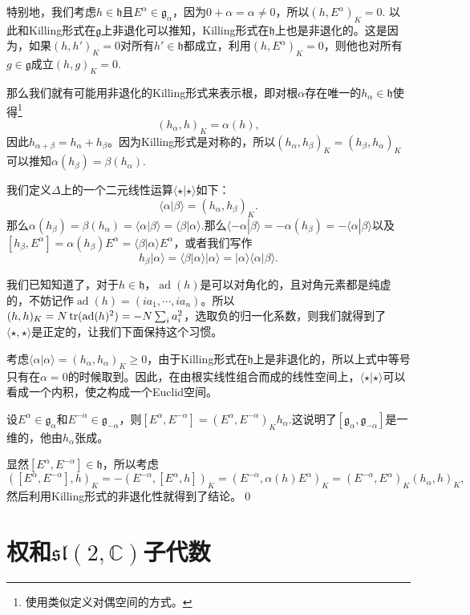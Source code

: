 \documentclass[9pt]{extarticle}
\newcommand{\cc}{\mathbb{C}}
\newcommand{\lag}{{\mathfrak{g}}}
\DeclareMathOperator{\ad}{ad}
\begin{document}
\para 特别地，我们考虑$h\in \mathfrak{h}$且$E^\alpha\in \lag_\alpha$，因为$0+\alpha=\alpha\neq 0$，所以$(h,E^\alpha)_K=0$. 以此和Killing形式在$\mathfrak{g}$上非退化可以推知，Killing形式在$\mathfrak{h}$上也是非退化的。这是因为，如果$(h,h')_K=0$对所有$h'\in \mathfrak{h}$都成立，利用$(h,E^\alpha)_K=0$，则他也对所有$g\in \lag$成立$(h,g)_K=0$.

那么我们就有可能用非退化的Killing形式来表示根，即对根$\alpha$存在唯一的$h_\alpha\in\mathfrak{h}$使得\footnote{使用类似定义对偶空间的方式。}
\[
	(h_\alpha,h)_K=\alpha(h),
\]
因此$h_{\alpha+\beta}=h_\alpha+h_\beta$。因为Killing形式是对称的，所以$(h_\alpha,h_\beta)_K=(h_\beta,h_\alpha)_K$可以推知$\alpha(h_\beta)=\beta(h_\alpha)$.

\para 我们定义$\Delta$上的一个二元线性运算$\langle \star|\star \rangle$如下：
\[
	\langle \alpha|\beta \rangle=(h_\alpha,h_\beta)_K.
\]
那么$\alpha(h_\beta)=\beta(h_\alpha)=\langle \alpha|\beta \rangle=\langle \beta|\alpha \rangle$.那么$\langle -\alpha|\beta \rangle=-\alpha(h_\beta)=-\langle \alpha|\beta \rangle$以及$[h_\beta,E^\alpha]=\alpha(h_\beta)E^\alpha=\langle \beta|\alpha \rangle E^\alpha$，或者我们写作
\[
	h_\beta|\alpha\rangle = \langle \beta|\alpha \rangle|\alpha\rangle=|\alpha\rangle \langle \alpha|\beta \rangle.
\]

\para 我们已知知道了，对于$h\in \mathfrak{h}$，$\ad(h)$是可以对角化的，且对角元素都是纯虚的，不妨记作$\ad(h)=(ia_1,\cdots,ia_n)$。所以$(h,h)_K=N\tr(\ad(h)^2)=-N\sum_i a_i^2$，选取负的归一化系数，则我们就得到了$\langle \star,\star \rangle$是正定的，让我们下面保持这个习惯。

考虑$\langle \alpha|\alpha\rangle = (h_\alpha,h_\alpha)_K\geq 0$，由于Killing形式在$\mathfrak{h}$上是非退化的，所以上式中等号只有在$\alpha=0$的时候取到。因此，在由根实线性组合而成的线性空间上，$\langle \star|\star\rangle$可以看成一个内积，使之构成一个Euclid空间。

\pro 设$E^\alpha \in \lag_\alpha$和$E^{-\alpha} \in \lag_{-\alpha}$，则$[E^{\alpha},E^{-\alpha}]=(E^{\alpha},E^{-\alpha})_Kh_\alpha$.这说明了$[\lag_{\alpha},\lag_{-\alpha}]$是一维的，他由$h_\alpha$张成。

\proof 显然$[E^\alpha,E^{-\alpha}]\in \mathfrak{h}$，所以考虑
\[
	([E^\alpha,E^{-\alpha}],h)_K=-(E^{-\alpha},[E^\alpha,h])_K=(E^{-\alpha},\alpha(h)E^\alpha)_K=(E^{-\alpha},E^\alpha)_K(h_\alpha,h)_K,
\]
然后利用Killing形式的非退化性就得到了结论。\qed

\section{权和$\mathfrak{sl}(2,\cc)$子代数}
\end{document}
